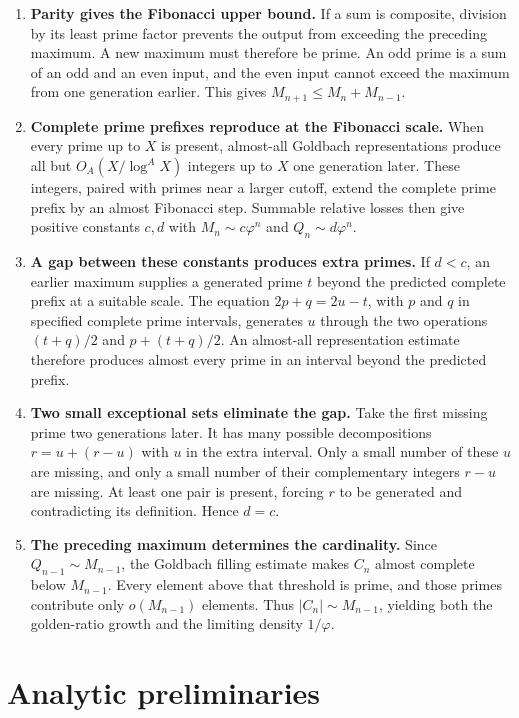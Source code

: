 \documentclass[11pt,letterpaper]{article}
\numberwithin{equation}{section}
\theoremstyle{remark}
\newcommand{\ph}{\varphi}
\begin{document}
\begin{enumerate}
\item \textbf{Parity gives the Fibonacci upper bound.}
If a sum is composite, division by its least prime factor prevents the
output from exceeding the preceding maximum. A new maximum must therefore
be prime. An odd prime is a sum of an odd and an even input, and the even
input cannot exceed the maximum from one generation earlier. This gives
$M_{n+1}\le M_n+M_{n-1}$.

\item \textbf{Complete prime prefixes reproduce at the Fibonacci scale.}
When every prime up to $X$ is present, almost-all Goldbach representations
produce all but $O_A(X/\log^A X)$ integers up to $X$ one generation later.
These integers, paired with primes near a larger cutoff, extend the complete
prime prefix by an almost Fibonacci step. Summable relative losses then give
positive constants $c,d$ with $M_n\sim c\ph^n$ and $Q_n\sim d\ph^n$.

\item \textbf{A gap between these constants produces extra primes.}
If $d<c$, an earlier maximum supplies a generated prime $t$ beyond the
predicted complete prefix at a suitable scale. The equation
$2p+q=2u-t$, with $p$ and $q$ in specified complete prime intervals,
generates $u$ through the two operations
$(t+q)/2$ and $p+(t+q)/2$. An almost-all representation estimate therefore
produces almost every prime in an interval beyond the predicted prefix.

\item \textbf{Two small exceptional sets eliminate the gap.}
Take the first missing prime two generations later. It has many possible
decompositions $r=u+(r-u)$ with $u$ in the extra interval. Only a small
number of these $u$ are missing, and only a small number of their complementary
integers $r-u$ are missing. At least one pair is present, forcing $r$ to be
generated and contradicting its definition. Hence $d=c$.

\item \textbf{The preceding maximum determines the cardinality.}
Since $Q_{n-1}\sim M_{n-1}$, the Goldbach filling estimate makes
$C_n$ almost complete below $M_{n-1}$. Every element above that threshold
is prime, and those primes contribute only $o(M_{n-1})$ elements.
Thus $|C_n|\sim M_{n-1}$, yielding both the golden-ratio growth and
the limiting density $1/\ph$.
\end{enumerate}

\section{Analytic preliminaries}
\end{document}
